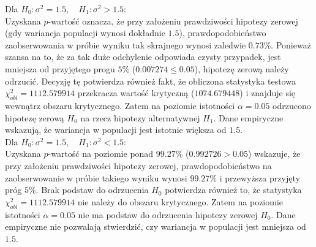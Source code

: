 \documentclass[12pt, a4paper]{article}
\begin{document}
	\noindent Dla $H_0: \sigma^2 = 1.5, \quad H_1: \sigma^2 > 1.5$:\\
	 Uzyskana $p$-wartość oznacza, że przy założeniu prawdziwości hipotezy zerowej (gdy wariancja populacji wynosi dokładnie $1.5$), prawdopodobieństwo zaobserwowania w próbie wyniku tak skrajnego wynosi zaledwie $0.73\%$. Ponieważ szansa na to, że za tak duże odchylenie odpowiada czysty przypadek, jest mniejsza od przyjętego progu $5\%$ ($0.007274 \le 0.05$), hipotezę zerową należy odrzucić. Decyzję tę potwierdza również fakt, że obliczona statystyka testowa $\chi^2_{obl} = 1112.579914$ przekracza wartość krytyczną ($1074.679448$) i znajduje się wewnątrz obszaru krytycznego. Zatem na poziomie istotności $\alpha = 0.05$ odrzucono hipotezę zerową $H_0$ na rzecz hipotezy alternatywnej $H_1$. Dane empiryczne wskazują, że wariancja w populacji jest istotnie większa od $1.5$.\\
	 
	\noindent Dla $H_0: \sigma^2 = 1.5, \quad H_1: \sigma^2 < 1.5$:\\
	Uzyskana $p$-wartość na poziomie ponad $99.27\%$ ($0.992726 > 0.05$) wskazuje, że przy założeniu prawdziwości hipotezy zerowej, prawdopodobieństwo na zaobserwowanie w próbie takiego wyniku wynosi $99.27\%$ i przewyższa przyjęty próg $5\%$. Brak podstaw do odrzucenia $H_0$ potwierdza również to, że statystyka $\chi^2_{obl} = 1112.579914$ nie należy do obszaru krytycznego. Zatem na poziomie istotności $\alpha = 0.05$ nie ma podstaw do odrzucenia hipotezy zerowej $H_0$. Dane empiryczne nie pozwalają stwierdzić, czy wariancja w populacji jest mniejsza od $1.5$.\\
	
\end{document}
